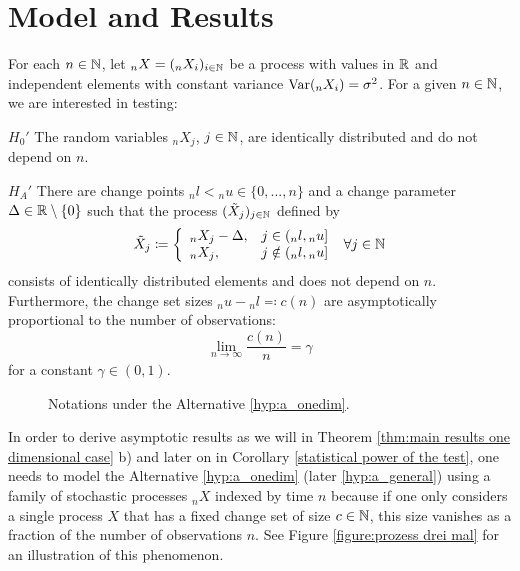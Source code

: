 \section{Model and Results}

For each $n \in \mathbb{N}$, let ${}_{n}X = ({}_{n}X_i)_{i \in \mathbb{N}}$ be a process with values in $\mathbb{R}$ and independent elements with constant variance $\mathrm{Var}({}_{n}X_i) = \sigma^2$.
For a given $n \in \mathbb{N}$, we are interested in testing:
\begin{hyp}{\ensuremath{H_0'}} \label{hyp:0_onedim} The random variables ${}_{n}X_j$, $j \in \mathbb{N}$, are identically distributed and do not depend on $n$. \end{hyp}
\begin{hyp}{\ensuremath{H_A'}} \label{hyp:a_onedim} There are change points ${}_{n}l < {}_{n}u \in \{0, ..., n\}$ and a change parameter $\Delta \in \mathbb{R} \setminus \{0\}$ such that the process $(\Tilde{X}_j)_{j \in \mathbb{N}}$ defined by
\[ 
    \Tilde{X}_j \coloneqq \left\{
    \begin{array}{ll}
    {}_{n}X_j - \Delta, & j \in ({}_{n}l, {}_{n}u] \\
    {}_{n}X_j, & j \notin ({}_{n}l, {}_{n}u] \\
    \end{array}
    \right.  \ \forall j \in \mathbb{N} 
\]
consists of identically distributed elements and does not depend on $n$. Furthermore, the change set sizes ${}_{n}u-{}_{n}l \eqqcolon c(n)$ are asymptotically proportional to the number of observations:
\begin{equation} \label{change set size bounds one dimensional case}
    \lim\limits_{n \to \infty} \frac{c(n)}{n} = \gamma
\end{equation} 
for a constant $\gamma \in (0, 1)$. \end{hyp}

\begin{figure}
    \centering
    \def\svgwidth{0.5\columnwidth} 
    
    \caption{Notations under the Alternative \ref{hyp:a_onedim}.}
\end{figure}


\begin{remark}
    In order to derive asymptotic results as we will in Theorem \ref{thm:main results one dimensional case} b) and later on in Corollary \ref{statistical power of the test}, one needs to model the Alternative \ref{hyp:a_onedim} (later \ref{hyp:a_general}) using a family of stochastic processes ${}_{n}X$ indexed by time $n$ because if one only considers a single process $X$ that has a fixed change set of size $c \in \mathbb{N}$, this size vanishes as a fraction of the number of observations $n$. See Figure \ref{figure:prozess drei mal} for an illustration of this phenomenon.
\end{remark}


